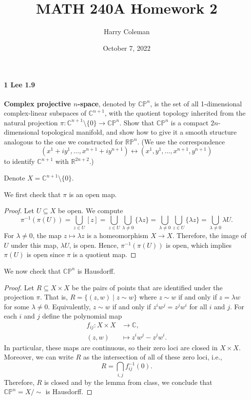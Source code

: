 \documentclass[12pt]{article}
\renewcommand{\maketitle}{\thispagestyle{title}}
\newlength{\myparskip}
\newenvironment{fullbox}{\begin{lrbox}{\savefullbox}\begin{minipage}{\dimexpr\textwidth-2\fboxsep\relax}\setlength{\parskip}{\myparskip}}{\end{minipage}\end{lrbox}\framebox[\textwidth]{\usebox{\savefullbox}}}
\newenvironment{pbox}[1][]{\begin{fullbox}\def\temp{#1}\ifx\temp\empty\else\paragraph{#1}\phantom{}\fi}{\end{fullbox}}
\theoremstyle{definition}
\newcommand{\R}{\mathbb{R}}
\newcommand{\C}{\mathbb{C}}
\renewcommand{\P}{\mathbb{P}}
\newcommand{\<}{\langle}
\renewcommand{\>}{\rangle}
\newcommand{\seq}{\subseteq}
\begin{document}
\title{MATH 240A Homework 2}
\author{Harry Coleman}
\date{October 7, 2022}
\maketitle

\begin{pbox}[1 Lee 1.9]
    \textbf{Complex projective $n$-space}, denoted by $\C\P^n$, is the set of all 1-dimensional complex-linear subspaces of $\C^{n+1}$, with the quotient topology inherited from the natural projection $\pi: \C^{n+1}\setminus\{0\} \to \C\P^n$. Show that $\C\P^n$ is a compact $2n$-dimensional topological manifold, and show how to give it a smooth structure analogous to the one we constructed for $\R\P^n$. (We use the correspondence
    \[(x^1+iy^1,\dots,x^{n+1}+iy^{n+1}) \leftrightarrow (x^1,y^1,\dots,x^{n+1},y^{n+1})\]
    to identify $\C^{n+1}$ with $\R^{2n+2}$.)
\end{pbox}

Denote $X = \C^{n+1} \setminus \{0\}$.

We first check that $\pi$ is an open map.

\begin{proof}
    Let $U \seq X$ be open.
    We compute
    \[
        \pi^{-1}(\pi(U))
            = \bigcup_{z \in U} [z]
            = \bigcup_{z \in U} \bigcup_{\lambda \ne 0} \{\lambda z\}
            = \bigcup_{\lambda \ne 0} \bigcup_{z \in U} \{\lambda z\}
            = \bigcup_{\lambda \ne 0} \lambda U.
    \]
    For $\lambda \ne 0$, the map $z \mapsto \lambda z$ is a homeomorphism $X \to X$.
    Therefore, the image of $U$ under this map, $\lambda U$, is open.
    Hence, $\pi^{-1}(\pi(U))$ is open, which implies $\pi(U)$ is open since $\pi$ is a quotient map.
\end{proof}

We now check that $\C\P^n$ is Hausdorff.

\begin{proof}
    Let $R \seq X \times X$ be the pairs of points that are identified under the projection $\pi$.
    That is, $R = \{(z, w) \mid z \sim w\}$ where $z \sim w$ if and only if $z = \lambda w$ for some $\lambda \ne 0$.
    Equivalently, $z \sim w$ if and only if $z^iw^j = z^jw^i$ for all $i$ and $j$.
    For each $i$ and $j$ define the polynomial map
    \begin{align*}
        f_{ij} : X \times X &\longrightarrow \C, \\
            (z, w) &\longmapsto z^iw^j - z^jw^i.
    \end{align*}
    In particular, these maps are continuous, so their zero loci are closed in $X \times X$.
    Moreover, we can write $R$ as the intersection of all of these zero loci, i.e.,
    \[
        R = \bigcap_{i, j} f_{ij}^{-1}(0).
    \]
    Therefore, $R$ is closed and by the lemma from class, we conclude that $\C\P^n = X/{\sim}$ is Hausdorff.
\end{proof}
\end{document}
